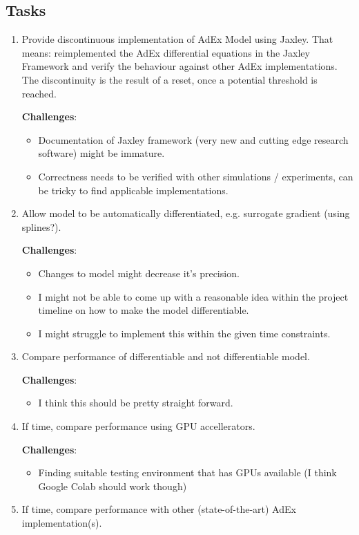 \documentclass[11pt,a4paper]{article}
\begin{document}
\subsection*{Tasks}
\begin{enumerate}
    \item Provide discontinuous implementation of AdEx Model using Jaxley. That means: reimplemented the AdEx differential equations in the Jaxley Framework
      and verify the behaviour against other AdEx implementations.
      The discontinuity is the result of a reset, once a potential threshold is reached.

    \textbf{Challenges}:
    \begin{itemize}
        \item Documentation of Jaxley framework (very new and cutting edge research software) might be immature.
        \item Correctness needs to be verified with other simulations / experiments, can be tricky to find applicable implementations.
    \end{itemize}

    \item Allow model to be automatically differentiated, e.g. surrogate gradient (using splines?).

    \textbf{Challenges}:
    \begin{itemize}
        \item Changes to model might decrease it's precision.
        \item I might not be able to come up with a reasonable idea within the project timeline on how to make the model differentiable.
        \item I might struggle to implement this within the given time constraints.
    \end{itemize}
    \item Compare performance of differentiable and not differentiable model.

    \textbf{Challenges}:
      \begin{itemize}
        \item I think this should be pretty straight forward.
      \end{itemize}
    \item If time, compare performance using GPU accellerators.

    \textbf{Challenges}:
      \begin{itemize}
      \item Finding suitable testing environment that has GPUs available (I think Google Colab should work though)
      \end{itemize}
    \item If time, compare performance with other (state-of-the-art) AdEx implementation(s).


\end{enumerate}
\end{document}
